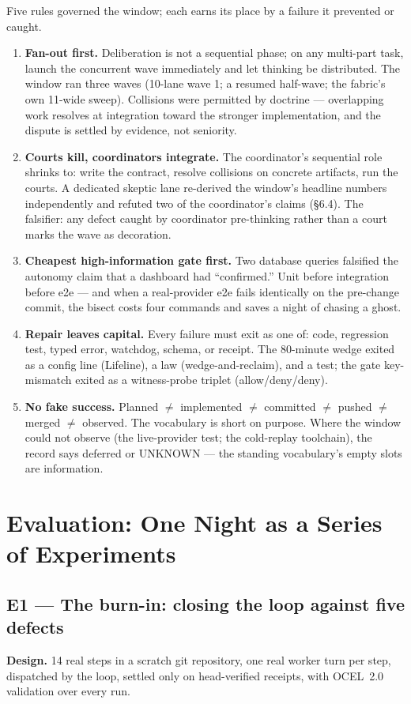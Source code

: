 \documentclass[11pt,a4paper]{article}
\theoremstyle{remark}
\begin{document}
Five rules governed the window; each earns its place by a failure it prevented or caught.
\begin{enumerate}
\item \textbf{Fan-out first.} Deliberation is not a sequential phase; on any multi-part task, launch the concurrent wave immediately and let thinking be distributed. The window ran three waves (10-lane wave 1; a resumed half-wave; the fabric's own 11-wide sweep). Collisions were permitted by doctrine --- overlapping work resolves at integration toward the stronger implementation, and the dispute is settled by evidence, not seniority.
\item \textbf{Courts kill, coordinators integrate.} The coordinator's sequential role shrinks to: write the contract, resolve collisions on concrete artifacts, run the courts. A dedicated skeptic lane re-derived the window's headline numbers independently and refuted two of the coordinator's claims (\S6.4). The falsifier: any defect caught by coordinator pre-thinking rather than a court marks the wave as decoration.
\item \textbf{Cheapest high-information gate first.} Two database queries falsified the autonomy claim that a dashboard had ``confirmed.'' Unit before integration before e2e --- and when a real-provider e2e fails identically on the pre-change commit, the bisect costs four commands and saves a night of chasing a ghost.
\item \textbf{Repair leaves capital.} Every failure must exit as one of: code, regression test, typed error, watchdog, schema, or receipt. The 80-minute wedge exited as a config line (Lifeline), a law (wedge-and-reclaim), and a test; the gate key-mismatch exited as a witness-probe triplet (allow/deny/deny).
\item \textbf{No fake success.} Planned $\neq$ implemented $\neq$ committed $\neq$ pushed $\neq$ merged $\neq$ observed. The vocabulary is short on purpose. Where the window could not observe (the live-provider test; the cold-replay toolchain), the record says deferred or UNKNOWN --- the standing vocabulary's empty slots are information.
\end{enumerate}

\section{Evaluation: One Night as a Series of Experiments}

\subsection{E1 --- The burn-in: closing the loop against five defects}
\textbf{Design.} 14 real steps in a scratch git repository, one real worker turn per step, dispatched by the loop, settled only on head-verified receipts, with OCEL~2.0 validation over every run.
\end{document}
